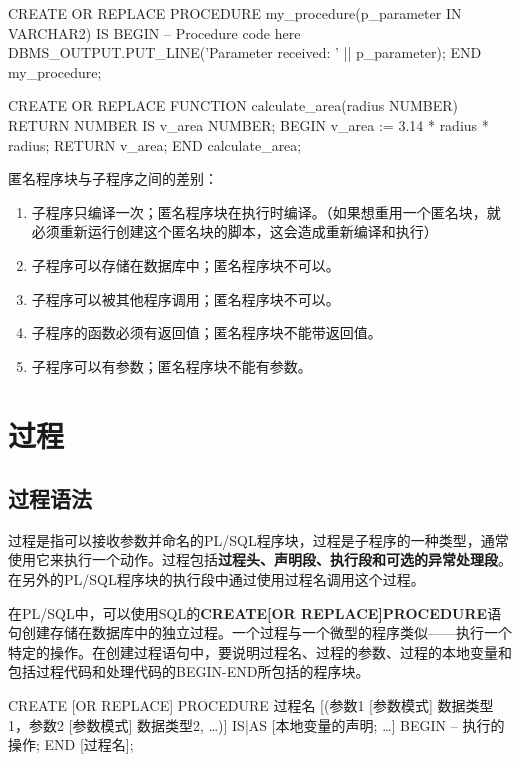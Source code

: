 \documentclass[11pt, a4paper, oneside, UTF8]{ctexbook}
\let\kaishu\relax %
\begin{document}
\begin{plsql}[caption=过程示例]
CREATE OR REPLACE PROCEDURE my_procedure(p_parameter IN VARCHAR2) 
  IS
BEGIN
  -- Procedure code here
  DBMS_OUTPUT.PUT_LINE('Parameter received: ' || p_parameter);
END my_procedure;
\end{plsql}

\begin{plsql}[caption=函数示例]
CREATE OR REPLACE FUNCTION calculate_area(radius NUMBER) RETURN NUMBER 
  IS
  v_area NUMBER;
BEGIN
  v_area := 3.14 * radius * radius;
  RETURN v_area;
END calculate_area;
\end{plsql}

匿名程序块与子程序之间的差别：
\begin{enumerate}
  \item 子程序只编译一次；匿名程序块在执行时编译。（如果想重用一个匿名块，就必须重新运行创建这个匿名块的脚本，这会造成重新编译和执行）
  \item 子程序可以存储在数据库中；匿名程序块不可以。
  \item 子程序可以被其他程序调用；匿名程序块不可以。
  \item 子程序的函数必须有返回值；匿名程序块不能带返回值。
  \item 子程序可以有参数；匿名程序块不能有参数。
\end{enumerate}

\section{过程}

\subsection{过程语法}
过程是指可以接收参数并命名的PL/SQL程序块，过程是子程序的一种类型，通常使用它来执行一个动作。过程包括\textbf{过程头、声明段、执行段和可选的异常处理段}。在另外的PL/SQL程序块的执行段中通过使用过程名调用这个过程。

在PL/SQL中，可以使用SQL的{\bfseries\kaishu CREATE[OR REPLACE]PROCEDURE}语句创建存储在数据库中的独立过程。一个过程与一个微型的程序类似——执行一个特定的操作。在创建过程语句中，要说明过程名、过程的参数、过程的本地变量和包括过程代码和处理代码的BEGIN-END所包括的程序块。

\begin{plsql}[caption=创建过程的语法]
CREATE [OR REPLACE] PROCEDURE 过程名
  [(参数1 [参数模式] 数据类型1，参数2 [参数模式] 数据类型2, …)]
IS|AS
  [本地变量的声明; …]
BEGIN
  -- 执行的操作;
END [过程名];
\end{plsql}
\end{document}
